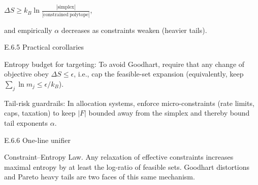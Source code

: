 \documentclass[11pt,a4paper]{article}
\begin{document}
$\Delta S \geq k_B \ln \frac{|\mathrm{simplex}|}{|\mathrm{constrained\ polytope}|}$,

and empirically $\alpha$ decreases as constraints weaken (heavier tails).

E.6.5 Practical corollaries

Entropy budget for targeting: To avoid Goodhart, require that any change of objective obey $\Delta S \leq \epsilon$, i.e., cap the feasible-set expansion (equivalently, keep $\sum_j \ln m_j \leq \epsilon / k_B$).

Tail-risk guardrails: In allocation systems, enforce micro-constraints (rate limits, caps, taxation) to keep $|F|$ bounded away from the simplex and thereby bound tail exponents $\alpha$.

E.6.6 One-line unifier

Constraint–Entropy Law. Any relaxation of effective constraints increases maximal entropy by at least the log-ratio of feasible sets. Goodhart distortions and Pareto heavy tails are two faces of this same mechanism.



\end{document}
